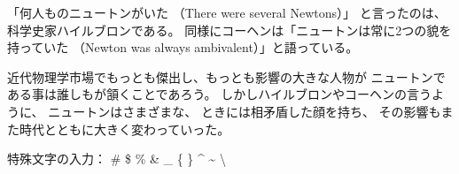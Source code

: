 \documentclass[paper=a5paper]{jlreq}
\begin{document}
「何人ものニュートンがいた （There were several Newtons）」
と言ったのは、科学史家ハイルブロンである。%
同様にコーヘンは「ニュートンは常に2つの貌を持っていた%
（Newton was always ambivalent）」と語っている。

\noindent 近代物理学市場でもっとも傑出し、もっとも影響の大きな人物が
ニュートンである事は誰しもが頷くことであろう。
しかしハイルブロンやコーヘンの言うように、
ニュートンはさまざまな、%
ときには相矛盾した顔を持ち、
その影響もまた時代とともに大きく変わっていった。


特殊文字の入力：
\# \$ \% \& \_ \{ \} \^{} \~{} \textbackslash
\end{document}
